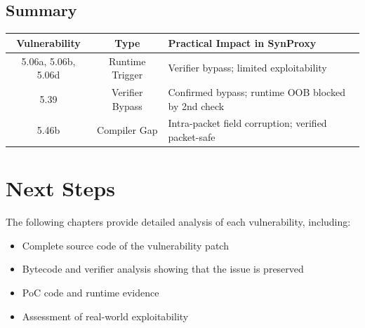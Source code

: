 \subsection{Summary}

\begin{center}
\begin{tabular}{|c|c|l|}
\hline
\textbf{Vulnerability} & \textbf{Type} & \textbf{Practical Impact in SynProxy} \\
\hline
5.06a, 5.06b, 5.06d & Runtime Trigger & Verifier bypass; limited exploitability \\
5.39 & Verifier Bypass & Confirmed bypass; runtime OOB blocked by 2nd check \\
5.46b & Compiler Gap & Intra-packet field corruption; verified packet-safe \\
\hline
\end{tabular}
\end{center}

\section{Next Steps}

The following chapters provide detailed analysis of each vulnerability, including:
\begin{itemize}
  \item Complete source code of the vulnerability patch
  \item Bytecode and verifier analysis showing that the issue is preserved
  \item PoC code and runtime evidence
  \item Assessment of real-world exploitability
\end{itemize}
